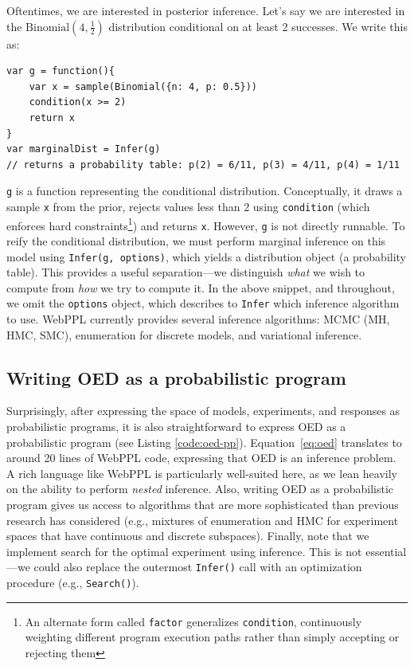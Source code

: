 \documentclass{article}
\begin{document}
Oftentimes, we are interested in posterior inference. Let's say we are interested in the $\text{Binomial}(4, \frac{1}{2})$ distribution conditional on at least 2 successes. We write this as:
\begin{lstlisting}[mathescape, label={code:webppl}]
var g = function(){
	var x = sample(Binomial({n: 4, p: 0.5}))
	condition(x >= 2)
	return x
}
var marginalDist = Infer(g)
// returns a probability table: p(2) = 6/11, p(3) = 4/11, p(4) = 1/11
\end{lstlisting}
\lstinline{g} is a function representing the conditional distribution.
Conceptually, it draws a sample \lstinline{x} from the prior, rejects values less than 2 using \lstinline{condition} (which enforces hard constraints\footnote{ An alternate form called \lstinline{factor} generalizes \lstinline{condition}, continuously weighting different program execution paths rather than simply accepting or rejecting them}) and returns \lstinline{x}.
However, \lstinline{g} is not directly runnable.
To reify the conditional distribution, we must perform marginal inference on this model using \lstinline{Infer(g, options)}, which yields a distribution object (a probability table).
This provides a useful separation---we distinguish \emph{what} we wish to compute from \emph{how} we try to compute it.
In the above snippet, and throughout, we omit the \lstinline{options} object, which describes to \lstinline{Infer} which inference algorithm to use. WebPPL currently provides several inference algorithms: MCMC (MH, HMC, SMC), enumeration for discrete models, and variational inference.

\subsection{Writing OED as a probabilistic program}

Surprisingly, after expressing the space of models, experiments, and responses as probabilistic programs, it is also straightforward to express OED as a probabilistic program (see Listing \ref{code:oed-pp}).
Equation~\ref{eq:oed} translates to around 20 lines of WebPPL code, expressing that OED is an inference problem.
A rich language like WebPPL is particularly well-suited here, as we lean heavily on the ability to perform \emph{nested} inference.
Also, writing OED as a probabilistic program gives us access to algorithms that are more sophisticated than previous research has considered (e.g., mixtures of enumeration and HMC for experiment spaces that have continuous and discrete subspaces).
Finally, note that we implement search for the optimal experiment using inference.
This is not essential---we could also replace the outermost \lstinline|Infer()| call with an optimization procedure (e.g., \lstinline|Search()|).
\end{document}
